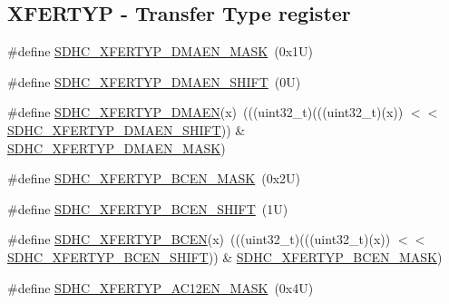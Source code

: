 \subsection*{X\+F\+E\+R\+T\+YP -\/ Transfer Type register}
\begin{DoxyCompactItemize}
\item 
\#define \mbox{\hyperlink{group___s_d_h_c___register___masks_ga4d3f71daacb879dbeb42972d25faa220}{S\+D\+H\+C\+\_\+\+X\+F\+E\+R\+T\+Y\+P\+\_\+\+D\+M\+A\+E\+N\+\_\+\+M\+A\+SK}}~(0x1\+U)
\item 
\#define \mbox{\hyperlink{group___s_d_h_c___register___masks_ga5cecfd8f158b456d3a2a9ea7820117b2}{S\+D\+H\+C\+\_\+\+X\+F\+E\+R\+T\+Y\+P\+\_\+\+D\+M\+A\+E\+N\+\_\+\+S\+H\+I\+FT}}~(0\+U)
\item 
\#define \mbox{\hyperlink{group___s_d_h_c___register___masks_ga45414859092637832fca84685421539e}{S\+D\+H\+C\+\_\+\+X\+F\+E\+R\+T\+Y\+P\+\_\+\+D\+M\+A\+EN}}(x)~(((uint32\+\_\+t)(((uint32\+\_\+t)(x)) $<$$<$ \mbox{\hyperlink{group___s_d_h_c___register___masks_ga5cecfd8f158b456d3a2a9ea7820117b2}{S\+D\+H\+C\+\_\+\+X\+F\+E\+R\+T\+Y\+P\+\_\+\+D\+M\+A\+E\+N\+\_\+\+S\+H\+I\+FT}})) \& \mbox{\hyperlink{group___s_d_h_c___register___masks_ga4d3f71daacb879dbeb42972d25faa220}{S\+D\+H\+C\+\_\+\+X\+F\+E\+R\+T\+Y\+P\+\_\+\+D\+M\+A\+E\+N\+\_\+\+M\+A\+SK}})
\item 
\#define \mbox{\hyperlink{group___s_d_h_c___register___masks_ga1d7dcef14285859fb5f204d71d2083cc}{S\+D\+H\+C\+\_\+\+X\+F\+E\+R\+T\+Y\+P\+\_\+\+B\+C\+E\+N\+\_\+\+M\+A\+SK}}~(0x2\+U)
\item 
\#define \mbox{\hyperlink{group___s_d_h_c___register___masks_ga25223c582d559cd31d3de92191c681c7}{S\+D\+H\+C\+\_\+\+X\+F\+E\+R\+T\+Y\+P\+\_\+\+B\+C\+E\+N\+\_\+\+S\+H\+I\+FT}}~(1\+U)
\item 
\#define \mbox{\hyperlink{group___s_d_h_c___register___masks_ga5f928aa28c03bf21f8ac4bc10ece6163}{S\+D\+H\+C\+\_\+\+X\+F\+E\+R\+T\+Y\+P\+\_\+\+B\+C\+EN}}(x)~(((uint32\+\_\+t)(((uint32\+\_\+t)(x)) $<$$<$ \mbox{\hyperlink{group___s_d_h_c___register___masks_ga25223c582d559cd31d3de92191c681c7}{S\+D\+H\+C\+\_\+\+X\+F\+E\+R\+T\+Y\+P\+\_\+\+B\+C\+E\+N\+\_\+\+S\+H\+I\+FT}})) \& \mbox{\hyperlink{group___s_d_h_c___register___masks_ga1d7dcef14285859fb5f204d71d2083cc}{S\+D\+H\+C\+\_\+\+X\+F\+E\+R\+T\+Y\+P\+\_\+\+B\+C\+E\+N\+\_\+\+M\+A\+SK}})
\item 
\#define \mbox{\hyperlink{group___s_d_h_c___register___masks_ga1940add41a5918da9c0b045597e0c497}{S\+D\+H\+C\+\_\+\+X\+F\+E\+R\+T\+Y\+P\+\_\+\+A\+C12\+E\+N\+\_\+\+M\+A\+SK}}~(0x4\+U)

\end{DoxyCompactItemize}
